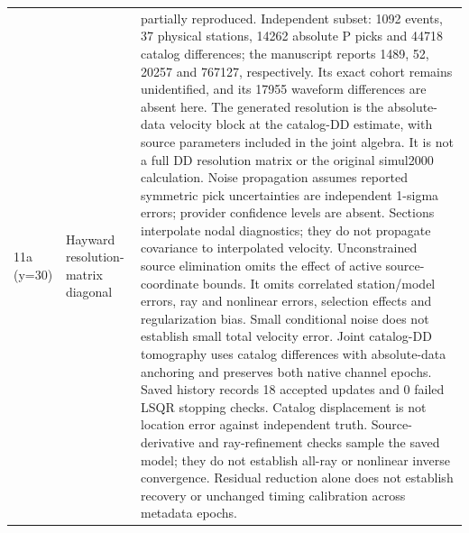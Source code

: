 \begin{longtable}{>{\raggedright\arraybackslash}p{}>{\raggedright\arraybackslash}p{}>{\raggedright\arraybackslash}p{}}
11a (y=30) & Hayward resolution-matrix diagonal & partially reproduced. Independent subset: 1092 events, 37 physical stations, 14262 absolute P picks and 44718 catalog differences; the manuscript reports 1489, 52, 20257 and 767127, respectively. Its exact cohort remains unidentified, and its 17955 waveform differences are absent here. The generated resolution is the absolute-data velocity block at the catalog-DD estimate, with source parameters included in the joint algebra. It is not a full DD resolution matrix or the original simul2000 calculation. Noise propagation assumes reported symmetric pick uncertainties are independent 1-sigma errors; provider confidence levels are absent. Sections interpolate nodal diagnostics; they do not propagate covariance to interpolated velocity. Unconstrained source elimination omits the effect of active source-coordinate bounds. It omits correlated station/model errors, ray and nonlinear errors, selection effects and regularization bias. Small conditional noise does not establish small total velocity error. Joint catalog-DD tomography uses catalog differences with absolute-data anchoring and preserves both native channel epochs. Saved history records 18 accepted updates and 0 failed LSQR stopping checks. Catalog displacement is not location error against independent truth. Source-derivative and ray-refinement checks sample the saved model; they do not establish all-ray or nonlinear inverse convergence. Residual reduction alone does not establish recovery or unchanged timing calibration across metadata epochs.\\

\end{longtable}
